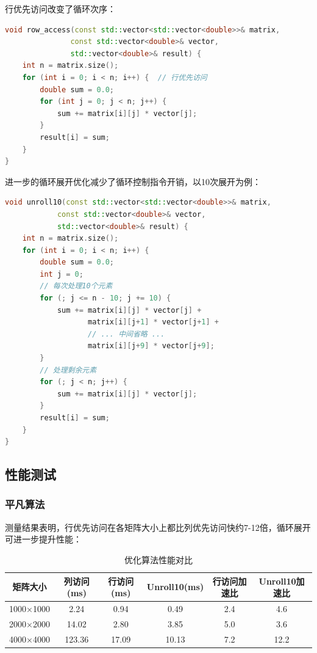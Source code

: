 \documentclass[a4paper,colorlinks=true,linkcolor=blue,urlcolor=blue,citecolor=green,bookmarks=true]{article}
\begin{document}
行优先访问改变了循环次序：

\begin{lstlisting}[language=C++]
void row_access(const std::vector<std::vector<double>>& matrix, 
               const std::vector<double>& vector,
               std::vector<double>& result) {
    int n = matrix.size();
    for (int i = 0; i < n; i++) {  // 行优先访问
        double sum = 0.0;
        for (int j = 0; j < n; j++) {
            sum += matrix[i][j] * vector[j];
        }
        result[i] = sum;
    }
}
\end{lstlisting}

进一步的循环展开优化减少了循环控制指令开销，以10次展开为例：

\begin{lstlisting}[language=C++]
void unroll10(const std::vector<std::vector<double>>& matrix, 
            const std::vector<double>& vector,
            std::vector<double>& result) {
    int n = matrix.size();
    for (int i = 0; i < n; i++) {
        double sum = 0.0;
        int j = 0;
        // 每次处理10个元素
        for (; j <= n - 10; j += 10) {
            sum += matrix[i][j] * vector[j] +
                   matrix[i][j+1] * vector[j+1] +
                   // ... 中间省略 ...
                   matrix[i][j+9] * vector[j+9];
        }
        // 处理剩余元素
        for (; j < n; j++) {
            sum += matrix[i][j] * vector[j];
        }
        result[i] = sum;
    }
}
\end{lstlisting}

\subsection{性能测试}

\subsubsection{平凡算法}

测量结果表明，行优先访问在各矩阵大小上都比列优先访问快约7-12倍，循环展开可进一步提升性能：

\begin{table}[htbp]
\centering
\caption{优化算法性能对比}
\label{tab:opt_perf}
\begin{tabular}{|c|c|c|c|c|c|}
\hline
\textbf{矩阵大小} & \textbf{列访问(ms)} & \textbf{行访问(ms)} & \textbf{Unroll10(ms)} & \textbf{行访问加速比} & \textbf{Unroll10加速比} \\
\hline
1000×1000 & 2.24 & 0.94 & 0.49 & 2.4 & 4.6 \\
\hline
2000×2000 & 14.02 & 2.80 & 3.85 & 5.0 & 3.6 \\
\hline
4000×4000 & 123.36 & 17.09 & 10.13 & 7.2 & 12.2 \\
\hline
\end{tabular}
\end{table}
\end{document}
